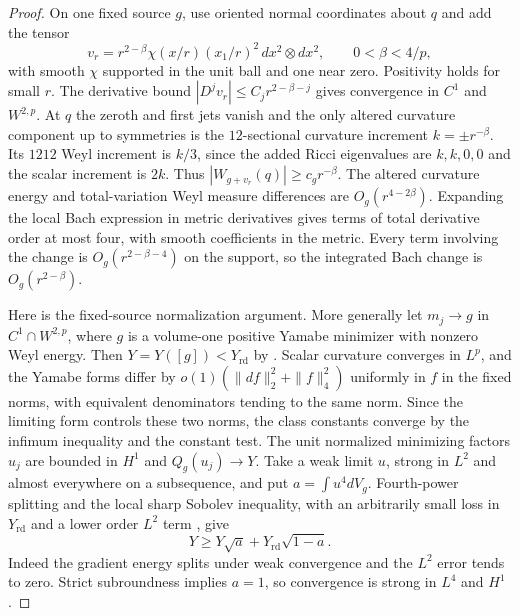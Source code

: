 \documentclass[11pt]{article}
\numberwithin{equation}{section}
\theoremstyle{definition}
\theoremstyle{remark}
\newcommand{\Yrd}{Y_{\mathrm{rd}}}
\begin{document}
\begin{proof}
On one fixed source \(g\), use oriented normal coordinates
about \(q\) and add the tensor
\[
 v_r=r^{2-\beta}\chi(x/r)(x_1/r)^2\,dx^2\otimes dx^2,
 \qquad 0<\beta<4/p ,
\]
with smooth \(\chi\) supported in the unit ball and one
near zero. Positivity holds for small \(r\).
The derivative bound \(|D^j v_r|\le C_jr^{2-\beta-j}\)
gives convergence in \(C^1\) and \(W^{2,p}\).
At \(q\) the zeroth and first jets vanish and the
only altered curvature component up to symmetries is the
\(12\)-sectional curvature increment \(k=\pm r^{-\beta}\).
Its \(1212\) Weyl increment is \(k/3\), since the added
Ricci eigenvalues are \(k,k,0,0\) and the scalar increment
is \(2k\). Thus \(|W_{g+v_r}(q)|\ge c_g r^{-\beta}\).
The altered curvature energy and total-variation Weyl
measure differences are \(O_g(r^{4-2\beta})\). Expanding
the local Bach expression in metric derivatives gives terms
of total derivative order at most four, with smooth
coefficients in the metric. Every term involving the change
is \(O_g(r^{2-\beta-4})\) on the support, so the integrated
Bach change is \(O_g(r^{2-\beta})\).

Here is the fixed-source normalization argument. More
generally let \(m_j\to g\) in \(C^1\cap W^{2,p}\), where
\(g\) is a volume-one positive Yamabe minimizer with
nonzero Weyl energy. Then \(Y=Y([g])<\Yrd\) by
\cite[Theorem 2]{Schoen1984Yamabe}. Scalar curvature
converges in \(L^p\), and the Yamabe forms differ by
\(o(1)(\|df\|_2^2+\|f\|_4^2)\) uniformly in \(f\) in the
fixed norms, with equivalent denominators tending to the
same norm. Since the limiting form controls these two
norms, the class constants converge by the infimum
inequality and the constant test. The unit normalized
minimizing factors \(u_j\) are bounded in \(H^1\) and
\(Q_g(u_j)\to Y\). Take a weak limit \(u\), strong in
\(L^2\) and almost everywhere on a subsequence, and put
\(a=\int u^4dV_g\). Fourth-power splitting
\cite[Theorem 1]{BrezisLieb1983Functional} and the
local sharp Sobolev inequality, with an arbitrarily small
loss in \(\Yrd\) and a lower order \(L^2\) term
\cite[Sections 2--4]{LeeParker1987Yamabe}, give
\[
 Y\ge Y\sqrt a+\Yrd\sqrt{1-a}.
\]
Indeed the gradient energy splits under weak convergence
and the \(L^2\) error tends to zero. Strict subroundness
implies \(a=1\), so convergence is strong in \(L^4\)
and \(H^1\).


\end{proof}
\end{document}
